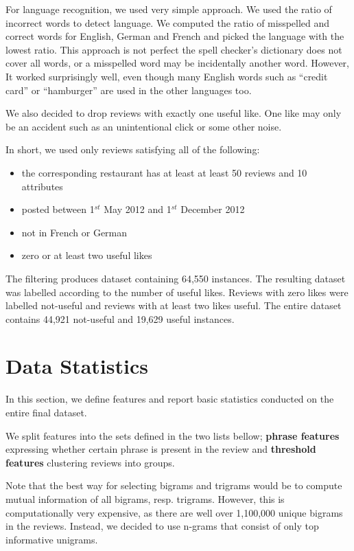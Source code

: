 For language recognition, we used very simple approach.
We used the ratio of incorrect words to detect language.
We computed the ratio of misspelled and correct words for English, German and French and
picked the language with the lowest ratio.
This approach is not perfect the spell checker's dictionary does not cover all words, or a misspelled word may be incidentally another word.
However, It worked surprisingly well, even though many English words such as ``credit card'' or ``hamburger'' are used in the other languages too.

We also decided to drop reviews with exactly one useful like.
One like may only be an accident such as an unintentional click or some other noise.

In short, we used only reviews satisfying all of the following:

\begin{itemize}
	\item the corresponding restaurant has at least at least 50 reviews and 10 attributes
	\item posted between 1$^{st}$ May 2012 and 1$^{st}$ December 2012
	\item not in French or German
	\item zero or at least two useful likes
\end{itemize}

The filtering produces dataset containing 64,550 instances.
The resulting dataset was labelled according to the number of useful likes.
Reviews with zero likes were labelled not-useful and
reviews with at least two likes useful.
The entire dataset contains 44,921 not-useful and
19,629 useful instances.



\section{Data Statistics}\label{sec:data_stats}

In this section, we define features
and report basic statistics conducted on the entire final dataset.

We split features into the sets defined in the two lists bellow;
\textbf{phrase features} expressing whether certain phrase is present in the review and
\textbf{threshold features} clustering reviews into groups.

Note that the best way for selecting bigrams and trigrams would be to compute mutual information of all bigrams, resp. trigrams.
However, this is computationally very expensive, as there are well over 1,100,000 unique bigrams in the reviews.
Instead, we decided to use n-grams that consist of only top informative unigrams.

